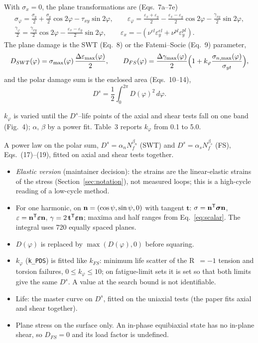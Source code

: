  With $\sigma_x=0$, the plane transformations are (Eqs.~7a--7e)
\begin{gather}
\sigma_\varphi = \tfrac{\sigma_y}{2}+\tfrac{\sigma_y}{2}\cos2\varphi-\tau_{xy}\sin2\varphi ,\qquad
\varepsilon_\varphi = \tfrac{\varepsilon_x+\varepsilon_y}{2}-\tfrac{\varepsilon_x-\varepsilon_y}{2}\cos2\varphi-\tfrac{\gamma_{xy}}{2}\sin2\varphi ,\\
\tfrac{\gamma_\varphi}{2} = \tfrac{\gamma_{xy}}{2}\cos2\varphi-\tfrac{\varepsilon_x-\varepsilon_y}{2}\sin2\varphi ,\qquad
\varepsilon_x = -(\nu^{el}\varepsilon_y^{el}+\nu^{pl}\varepsilon_y^{pl}) .
\end{gather}
The plane damage is the SWT (Eq.~8) or the Fatemi--Socie (Eq.~9) parameter,
\begin{equation}
D_{SWT}(\varphi) = \sigma_{\max}(\varphi)\,\frac{\Delta\varepsilon_{\max}(\varphi)}{2} ,\qquad
D_{FS}(\varphi) = \frac{\Delta\gamma_{\max}(\varphi)}{2}\Bigl(1+k_\varphi\frac{\sigma_{n,\max}(\varphi)}{\sigma_{yt}}\Bigr) ,
\end{equation}
and the polar damage sum is the enclosed area (Eqs.~10--14),
\begin{equation}
D^s = \frac12\int_0^{2\pi} D(\varphi)^2\,d\varphi .
\label{eq:pds}
\end{equation}

 $k_\varphi$ is varied until the $D^s$--life points of the axial
and shear tests fall on one band (Fig.~4); $\alpha$, $\beta$ by a power fit. Table~3 reports
$k_\varphi$ from 0.1 to 5.0.

 A power law on the polar sum, $D^s=\alpha_n N_f^{\beta_n}$ (SWT) and
$D^s=\alpha_s N_f^{\beta_s}$ (FS), Eqs.~(17)--(19), fitted on axial and shear tests together.

\begin{itemize}
\item \emph{Elastic version} (maintainer decision): the strains are the linear-elastic strains of
  the stress (Section~\ref{sec:notation}), not measured loops; this is a high-cycle reading of a
  low-cycle method.
\item For one harmonic, on $\mathbf n=(\cos\psi,\sin\psi,0)$ with tangent $\mathbf t$:
  $\sigma=\mathbf n^{\mathsf T}\boldsymbol\sigma\mathbf n$, $\varepsilon=\mathbf n^{\mathsf T}\boldsymbol\varepsilon\mathbf n$,
  $\gamma=2\,\mathbf t^{\mathsf T}\boldsymbol\varepsilon\mathbf n$; maxima and half ranges from Eq.~\eqref{eq:scalar}.
  The integral uses 720 equally spaced planes.
\item $D(\varphi)$ is replaced by $\max(D(\varphi),0)$ before squaring.
\item $k_\varphi$ (\texttt{k\_PDS}) is fitted like $k_{FS}$: minimum life scatter of the R~$=-1$
  tension and torsion failures, $0\le k_\varphi\le10$; on fatigue-limit sets it is set so that both
  limits give the same $D^s$. A value at the search bound is not identifiable.
\item Life: the master curve on $D^s$, fitted on the uniaxial tests (the paper fits axial and shear
  together).
\item Plane stress on the surface only. An in-phase equibiaxial state has no in-plane shear, so
  $D_{FS}=0$ and its load factor is undefined.
\end{itemize}


